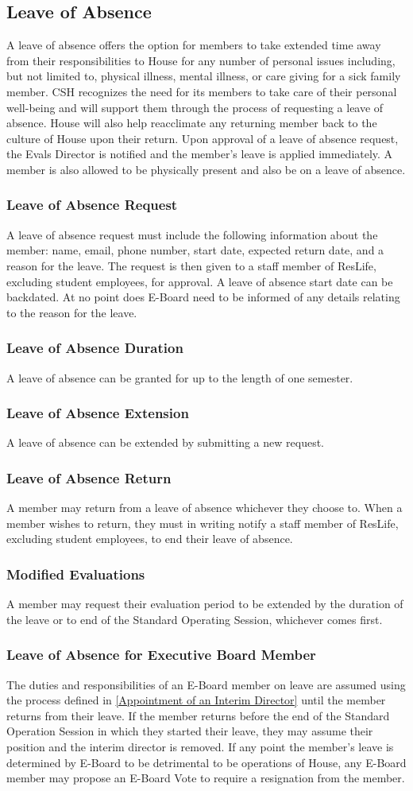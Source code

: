 \documentclass{article}
\newcommand{\asection}[1]{\subsection{#1} \label{#1}}
\newcommand{\asubsection}[1]{\subsubsection{#1} \label{#1}}
\begin{document}
\asection{Leave of Absence}
A leave of absence offers the option for members to take extended time away from their responsibilities to House for any number of personal issues including, but not limited to, physical illness, mental illness, or care giving for a sick family member.
CSH recognizes the need for its members to take care of their personal well-being and will support them through the process of requesting a leave of absence.
House will also help reacclimate any returning member back to the culture of House upon their return.
Upon approval of a leave of absence request, the Evals Director is notified and the member's leave is applied immediately.
A member is also allowed to be physically present and also be on a leave of absence.

\asubsection{Leave of Absence Request}
A leave of absence request must include the following information about the member: name, email, phone number, start date, expected return date, and a reason for the leave.
The request is then given to a staff member of ResLife, excluding student employees, for approval.
A leave of absence start date can be backdated.
At no point does E-Board need to be informed of any details relating to the reason for the leave.

\asubsection{Leave of Absence Duration}
A leave of absence can be granted for up to the length of one semester.

\asubsection{Leave of Absence Extension}
A leave of absence can be extended by submitting a new request.

\asubsection{Leave of Absence Return}
A member may return from a leave of absence whichever they choose to.
When a member wishes to return, they must in writing notify a staff member of ResLife, excluding student employees, to end their leave of absence.

\asubsection{Modified Evaluations}
A member may request their evaluation period to be extended by the duration of the leave or to end of the Standard Operating Session, whichever comes first.

\asubsection{Leave of Absence for Executive Board Member}
The duties and responsibilities of an E-Board member on leave are assumed using the process defined in \ref{Appointment of an Interim Director} until the member returns from their leave.
If the member returns before the end of the Standard Operation Session in which they started their leave, they may assume their position and the interim director is removed. %
If any point the member's leave is determined by E-Board to be detrimental to be operations of House, any E-Board member may propose an E-Board Vote to require a resignation from the member.
\end{document}
